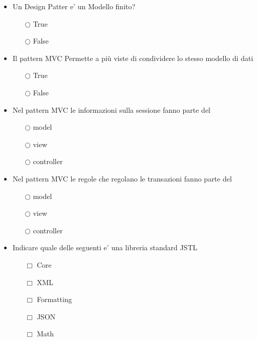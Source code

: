 \documentclass[10pt,twocolumn]{article}
\begin{document}
\begin{itemize}
    \item Un Design Patter e' un Modello finito?
          \begin{itemize}
              \item[$\bigcirc$] True
              \item[$\bigcirc$] False
          \end{itemize}
\end{itemize}
\begin{itemize}
    \item Il pattern MVC Permette a più viste di condividere lo stesso modello di dati
          \begin{itemize}
              \item[$\bigcirc$] True
              \item[$\bigcirc$] False
          \end{itemize}
\end{itemize}
\begin{itemize}
    \item Nel pattern MVC le informazioni sulla sessione fanno parte del
          \begin{itemize}
              \item[$\bigcirc$] model
              \item[$\bigcirc$] view
              \item[$\bigcirc$] controller
          \end{itemize}
\end{itemize}
\begin{itemize}
    \item Nel pattern MVC le regole che regolano le transazioni fanno parte del
          \begin{itemize}
              \item[$\bigcirc$] model
              \item[$\bigcirc$] view
              \item[$\bigcirc$] controller
          \end{itemize}
\end{itemize}
\begin{itemize}
    \item Indicare quale delle seguenti e' una libreria standard JSTL
          \begin{itemize}
              \item[$\Box$] Core
              \item[$\Box$] XML
              \item[$\Box$] Formatting
              \item[$\Box$] JSON
              \item[$\Box$] Math
          \end{itemize}
\end{itemize}
\end{document}

